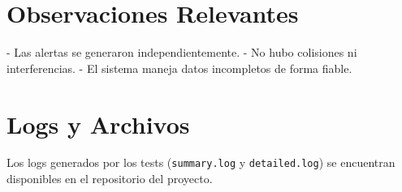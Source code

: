 \section{Observaciones Relevantes}
\label{anexo:pruebas:observaciones}

- Las alertas se generaron independientemente.
- No hubo colisiones ni interferencias.
- El sistema maneja datos incompletos de forma fiable.

\section{Logs y Archivos}
\label{anexo:pruebas:logs}

Los logs generados por los tests (\texttt{summary.log} y \texttt{detailed.log}) se encuentran disponibles en el repositorio del proyecto.